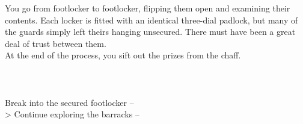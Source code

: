 You go from footlocker to footlocker, flipping them open and examining their contents. Each locker is fitted with an identical three-dial padlock, but many of the guards simply left theirs hanging unsecured. There must have been a great deal of trust between them.\\

At the end of the process, you sift out the prizes from the chaff.\\
\\
\\
\\

 Break into the secured footlocker -- \\
> Continue exploring the barracks -- 